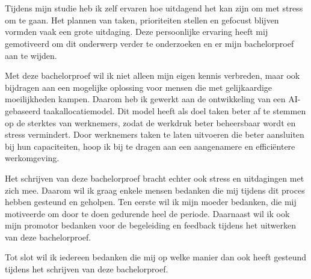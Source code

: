 
\chapter*{}%
\label{ch:voorwoord}


Tijdens mijn studie heb ik zelf ervaren hoe uitdagend het kan zijn om met stress om te gaan. Het plannen van taken, prioriteiten stellen en gefocust blijven vormden vaak een grote uitdaging. Deze persoonlijke ervaring heeft mij gemotiveerd om dit onderwerp verder te onderzoeken en er mijn bachelorproef aan te wijden.

Met deze bachelorproef wil ik niet alleen mijn eigen kennis verbreden, maar ook bijdragen aan een mogelijke oplossing voor mensen die met gelijkaardige moeilijkheden kampen. Daarom heb ik gewerkt aan de ontwikkeling van een AI-gebaseerd taakallocatiemodel. Dit model heeft als doel taken beter af te stemmen op de sterktes van werknemers, zodat de werkdruk beter beheersbaar wordt en stress vermindert. Door werknemers taken te laten uitvoeren die beter aansluiten bij hun capaciteiten, hoop ik bij te dragen aan een aangenamere en efficiëntere werkomgeving.

\vspace{1em}Het schrijven van deze bachelorproef bracht echter ook stress en uitdagingen met zich mee. Daarom wil ik graag enkele mensen bedanken die mij tijdens dit proces hebben gesteund en geholpen. Ten eerste wil ik mijn moeder bedanken, die mij motiveerde om door te doen gedurende heel de periode. Daarnaast wil ik ook mijn promotor bedanken voor de begeleiding en feedback tijdens het uitwerken van deze bachelorproef. 

Tot slot wil ik iedereen bedanken die mij op welke manier dan ook heeft gesteund tijdens het schrijven van deze bachelorproef.